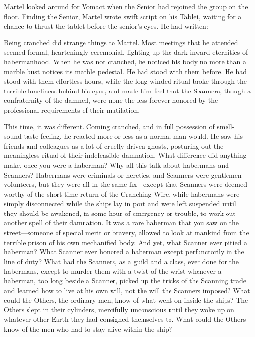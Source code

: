 Martel looked around for Vomact when the Senior had rejoined the group on the floor. Finding the Senior, Martel wrote swift script on his Tablet, waiting for a chance to thrust the tablet before the senior's eyes. He had written:


Being cranched did strange things to Martel. Most meetings that he attended seemed formal, hearteningly ceremonial, lighting up the dark inward eternities of habermanhood. When he was not cranched, he noticed his body no more than a marble bust notices its marble pedestal. He had stood with them before. He had stood with them effortless hours, while the long-winded ritual broke through the terrible loneliness behind his eyes, and made him feel that the Scanners, though a confraternity of the damned, were none the less forever honored by the professional requirements of their mutilation.

This time, it was different. Coming cranched, and in full possession of smell-sound-taste-feeling, he reacted more or less as a normal man would. He saw his friends and colleagues as a lot of cruelly driven ghosts, posturing out the meaningless ritual of their indefeasible damnation. What difference did anything make, once you were a haberman? Why all this talk about habermans and Scanners? Habermans were criminals or heretics, and Scanners were gentlemen-volunteers, but they were all in the same fix---except that Scanners were deemed worthy of the short-time return of the Cranching Wire, while habermans were simply disconnected while the ships lay in port and were left suspended until they should be awakened, in some hour of emergency or trouble, to work out another spell of their damnation. It was a rare haberman that you saw on the street---someone of special merit or bravery, allowed to look at mankind from the terrible prison of his own mechanified body. And yet, what Scanner ever pitied a haberman? What Scanner ever honored a haberman except perfunctorily in the line of duty? What had the Scanners, as a guild and a class, ever done for the habermans, except to murder them with a twist of the wrist whenever a haberman, too long beside a Scanner, picked up the tricks of the Scanning trade and learned how to live at his own will, not the will the Scanners imposed? What could the Others, the ordinary men, know of what went on inside the ships? The Others slept in their cylinders, mercifully unconscious until they woke up on whatever other Earth they had consigned themselves to. What could the Others know of the men who had to stay alive within the ship?

